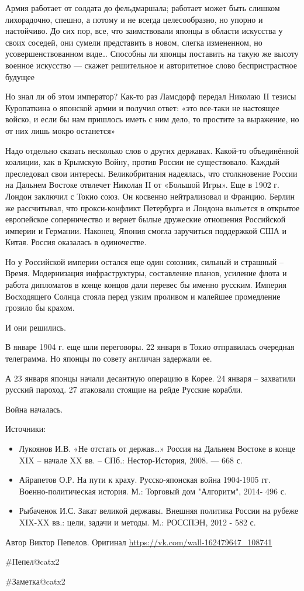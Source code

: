 \begin{textcitation}
	Армия работает от солдата до фельдмаршала; работает может быть слишком лихорадочно, спешно, а потому и не всегда целесообразно, но упорно и настойчиво. До сих пор, все, что заимствовали японцы в области искусства у своих соседей, они сумели представить в новом, слегка измененном, но усовершенствованном виде… Способны ли японцы поставить на такую же высоту военное искусство — скажет решительное и авторитетное слово беспристрастное будущее
\end{textcitation}

Но знал ли об этом император? Как-то раз Ламсдорф передал Николаю II тезисы Куропаткина о японской армии и получил ответ: «это все-таки не настоящее войско, и если бы нам пришлось иметь с ним дело, то простите за выражение, но от них лишь мокро останется»


Надо отдельно сказать несколько слов о других державах. Какой-то объединённой коалиции, как в Крымскую Войну, против России не существовало. Каждый преследовал свои интересы. Великобритания надеялась, что столкновение России на Дальнем Востоке отвлечет Николая II от «Большой Игры». Еще в 1902 г. Лондон заключил с Токио союз. Он косвенно нейтрализовал и Францию. Берлин же рассчитывал, что прокси-конфликт Петербурга и Лондона выльется в открытое европейское соперничество и вернет былые дружеские отношения Российской империи и Германии. Наконец, Япония смогла заручиться поддержкой США и Китая. Россия оказалась в одиночестве.

Но у Российской империи остался еще один союзник, сильный и страшный – Время. Модернизация инфраструктуры, составление планов, усиление флота и работа дипломатов в конце концов дали перевес бы именно русским. Империя Восходящего Солнца стояла перед узким проливом и малейшее промедление грозило бы крахом.

И они решились.

В январе 1904 г. еще шли переговоры. 22 января в Токио отправилась очередная телеграмма. Но японцы по совету англичан задержали ее.

А 23 января японцы начали десантную операцию в Корее. 24 января – захватили русский пароход. 27 атаковали стоящие на рейде Русские корабли.

Война началась.

Источники:
\begin{itemize}
	\item Лукоянов И.В. «Не отстать от держав…» Россия на Дальнем Востоке в конце XIX – начале XX вв. – СПб.: Нестор-История, 2008. — 668 с.
	\item Айрапетов О.Р. На пути к краху. Русско-японская война 1904-1905 гг. Военно-политическая история. М.: Торговый дом "Алгоритм", 2014- 496 с.
	\item Рыбаченок И.С. Закат великой державы. Внешняя политика России на рубеже XIX-XX вв.: цели, задачи и методы. М.: РОССПЭН, 2012 - 582 с.
\end{itemize}


Автор Виктор Пепелов. Оригинал \url{https://vk.com/wall-162479647_108741}

\#Пепел@catx2

\#Заметка@catx2
